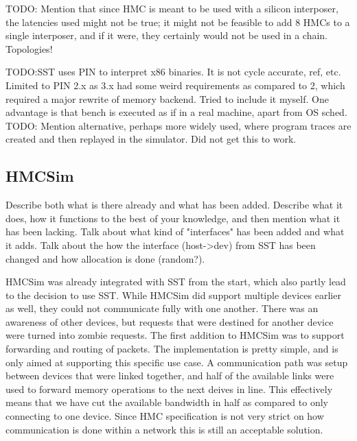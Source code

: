 TODO: Mention that since HMC is meant to be used with a silicon interposer, the latencies used might not be true; it might not be feasible to add 8 HMCs to a single interposer, and if it were, they certainly would not be used in a chain. Topologies!

TODO:SST uses PIN to interpret x86 binaries. It is not cycle accurate, ref, etc. Limited to PIN 2.x as 3.x had some weird requirements as compared to 2, which required a major rewrite of memory backend. Tried to include it myself. One advantage is that bench is executed as if in a real machine, apart from OS sched.
TODO: Mention alternative, perhaps more widely used, where program traces are created and then replayed in the simulator. Did not get this to work.




\subsection{HMCSim} \label{HMC-Sim}
Describe both what is there already and what has been added. Describe what it does, how it functions to the best of your knowledge, and then mention what it has been lacking. Talk about what kind of "interfaces" has been added and what it adds. Talk about the how the interface (host->dev) from SST has been changed and how allocation is done (random?). 

HMCSim was already integrated with SST from the start, which also partly lead to the decision to use SST. While HMCSim did support multiple devices earlier as well, they could not communicate fully with one another. There was an awareness of other devices, but requests that were destined for another device were turned into zombie requests. The first addition to HMCSim was to support forwarding and routing of packets. The implementation is pretty simple, and is only aimed at supporting this specific use case. A communication path was setup between devices that were linked together, and half of the available links were used to forward memory operations to the next deives in line. This effectively means that we have cut the available bandwidth in half as compared to only connecting to one device. Since HMC specification is not very strict on how communication is done within a network this is still an acceptable solution. 

